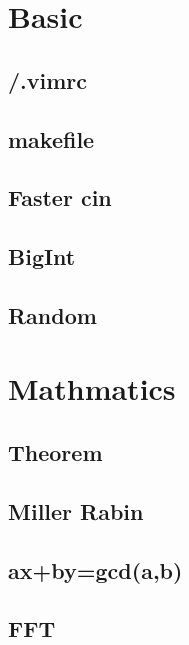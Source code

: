\section{Basic}

% 
\subsection{/.vimrc}

\subsection{makefile}

\subsection{Faster cin }

\subsection{BigInt}

\subsection{Random}


\section{Mathmatics}

\subsection{Theorem}

\subsection{Miller Rabin}

\subsection{ax+by=gcd(a,b)}

\subsection{FFT}

